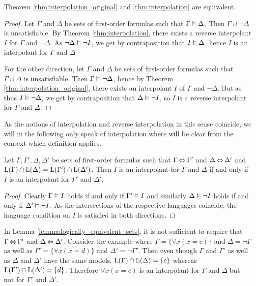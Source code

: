 \begin{prop}
	Theorem \ref{thm:interpolation_original} and \ref{thm:interpolation} are equivalent.
	\label{prop:interpolations_equivalent}
\end{prop}
\begin{proof}
	Let $\Gamma$ and $\Delta$ be sets of first-order formulas such that $ \Gamma \vDash \Delta$.
	Then $\Gamma \cup \lnot \Delta$ is unsatisfiable.
	By Theorem \ref{thm:interpolation}, there exists a reverse interpolant $I$ for $\Gamma$ and $\lnot \Delta$.
	As $\lnot \Delta \vDash \lnot I$, we get by contraposition that $I \vDash \Delta$, hence $I$ is an interpolant for $\Gamma$ and $\Delta$

	For the other direction,
	let $\Gamma$ and $\Delta$ be sets of first-order formulas such that $ \Gamma \cup \Delta$ is unsatisfiable.
	Then $\Gamma \vDash \lnot \Delta$, hence by Theorem \ref{thm:interpolation_original}, there exists an interpolant $I$ of $\Gamma$ and $\lnot \Delta$.
	But as thus $ I\vDash \lnot \Delta$, we get by contraposition that $\Delta \vDash \lnot I$, so $I$ is a reverse interpolant for $\Gamma$ and $\Delta$.
\end{proof}

As the notions of interpolation and reverse interpolation in this sense coincide, we will in the following only speak of interpolation where  will be clear from the context which definition applies.

\begin{lemma}
	\label{lemma:logically_equivalent_sets}
	Let $\Gamma, \Gamma', \Delta, \Delta'$ be sets of first-order formulas such that $\Gamma \operatorname{\Leftrightarrow} \Gamma'$ and $\Delta \operatorname{\Leftrightarrow} \Delta'$ and $\operatorname{L}(\Gamma) \cap \operatorname{L}(\Delta) = \operatorname{L}(\Gamma') \cap \operatorname{L}(\Delta')$.
	Then $I$ is an interpolant for $\Gamma$ and $\Delta$ if and only if $I$ is an interpolant for $\Gamma'$ and $\Delta'$.
\end{lemma}
\begin{proof}
	Clearly $\Gamma \vDash I$ holds if and only if $\Gamma' \vDash I$ and similarly
	$\Delta \vDash \lnot I$ holds if and only if $\Delta' \vDash \lnot I$.
	As the intersections of the respective languages coincide, the language condition on $I$ is satisfied in both directions.
\end{proof}

\begin{remark}
	In Lemma \ref{lemma:logically_equivalent_sets}, it is not sufficient to require that $\Gamma \operatorname{\Leftrightarrow} \Gamma'$ and $\Delta \operatorname{\Leftrightarrow} \Delta'$. 
	Consider the example where
	$\Gamma = \{ \forall x (x=c)\}$ and $\Delta = \lnot \Gamma$
	as well as  
	$\Gamma' = \{ \forall x (x=d)\}$ and $\Delta' = \lnot \Gamma'$.
	Then even though $\Gamma$ and $\Gamma'$ as well as $\Delta$ and $\Delta'$ have the same models,
	$\operatorname{L}(\Gamma) \cap \operatorname{L}(\Delta) = \{c\}$
	whereas
	$\operatorname{L}(\Gamma') \cap \operatorname{L}(\Delta') = \{d\}$.
	Therefore $\forall x (x=c)$ is an interpolant for $\Gamma$ and $\Delta$ but not for $\Gamma'$ and $\Delta'$.
\end{remark}

